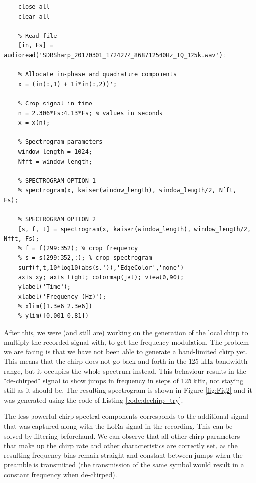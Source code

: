 \documentclass{icmmcm}
\newenvironment{code}{\captionsetup{type=listing}}{}
\begin{document}
\begin{code}
\begin{verbatim}
    close all
    clear all
    
    % Read file
    [in, Fs] = audioread('SDRSharp_20170301_172427Z_868712500Hz_IQ_125k.wav');
    
    % Allocate in-phase and quadrature components
    x = (in(:,1) + 1i*in(:,2))';
    
    % Crop signal in time
    n = 2.306*Fs:4.13*Fs; % values in seconds
    x = x(n);
    
    % Spectrogram parameters
    window_length = 1024;
    Nfft = window_length;
    
    % SPECTROGRAM OPTION 1
    % spectrogram(x, kaiser(window_length), window_length/2, Nfft, Fs);
    
    % SPECTROGRAM OPTION 2
    [s, f, t] = spectrogram(x, kaiser(window_length), window_length/2, Nfft, Fs);
    % f = f(299:352); % crop frequency
    % s = s(299:352,:); % crop spectrogram
    surf(f,t,10*log10(abs(s.')),'EdgeColor','none')
    axis xy; axis tight; colormap(jet); view(0,90);
    ylabel('Time');
    xlabel('Frequency (Hz)');
    % xlim([1.3e6 2.3e6])
    % ylim([0.001 0.81])
\end{verbatim}
\label{code:spectrogram_plot}
\end{code}

After this, we were (and still are) working on the generation of the local chirp to multiply the recorded signal with, to get the frequency modulation. The problem we are facing is that we have not been able to generate a band-limited chirp yet. This means that the chirp does not go back and forth in the 125 kHz bandwidth range, but it occupies the whole spectrum instead. This behaviour results in the "de-chirped" signal to show jumps in frequency in steps of 125 kHz, not staying still as it should be. The resulting spectrogram is shown in Figure \ref{fig:Fig2} and it was generated using the code of Listing \ref{code:dechirp_try}.

The less powerful chirp spectral components corresponds to the additional signal that was captured along with the LoRa signal in the recording. This can be solved by filtering beforehand. We can observe that all other chirp parameters that make up the chirp rate and other characteristics are correctly set, as the resulting frequency bins remain straight and constant between jumps when the preamble is transmitted (the transmission of the same symbol would result in a constant frequency when de-chirped).
\end{document}
